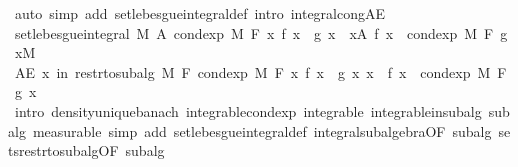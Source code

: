 \begin{isabellebody}
\ {\isacharparenleft}{\kern0pt}auto\ simp\ add{\isacharcolon}{\kern0pt}\ set{\isacharunderscore}{\kern0pt}lebesgue{\isacharunderscore}{\kern0pt}integral{\isacharunderscore}{\kern0pt}def\ intro{\isacharcolon}{\kern0pt}\ integral{\isacharunderscore}{\kern0pt}cong{\isacharunderscore}{\kern0pt}AE{\isacharparenright}{\kern0pt}\isanewline
\ \ \ \ \isamarkupfalse%
\ \isamarkupfalse%
\ {\isachardoublequoteopen}set{\isacharunderscore}{\kern0pt}lebesgue{\isacharunderscore}{\kern0pt}integral\ M\ A\ {\isacharparenleft}{\kern0pt}cond{\isacharunderscore}{\kern0pt}exp\ M\ F\ {\isacharparenleft}{\kern0pt}{\isasymlambda}x{\isachardot}{\kern0pt}\ f\ x\ {\isacharasterisk}{\kern0pt}\ g\ x{\isacharparenright}{\kern0pt}{\isacharparenright}{\kern0pt}\ {\isacharequal}{\kern0pt}\ {\isasymintegral}x{\isasymin}A{\isachardot}{\kern0pt}\ {\isacharparenleft}{\kern0pt}f\ x\ {\isacharasterisk}{\kern0pt}\ cond{\isacharunderscore}{\kern0pt}exp\ M\ F\ g\ x{\isacharparenright}{\kern0pt}{\isasympartial}M{\isachardoublequoteclose}\ \isacommand{{\isachardot}{\kern0pt}}\isamarkupfalse%
\isanewline
\ \ \isacommand{{\isacharbraceright}{\kern0pt}}\isamarkupfalse%
\isanewline
\ \ \isamarkupfalse%
\ {\isachardoublequoteopen}AE\ x\ in\ restr{\isacharunderscore}{\kern0pt}to{\isacharunderscore}{\kern0pt}subalg\ M\ F{\isachardot}{\kern0pt}\ cond{\isacharunderscore}{\kern0pt}exp\ M\ F\ {\isacharparenleft}{\kern0pt}{\isasymlambda}x{\isachardot}{\kern0pt}\ f\ x\ {\isacharasterisk}{\kern0pt}\ g\ x{\isacharparenright}{\kern0pt}\ x\ {\isacharequal}{\kern0pt}\ f\ x\ {\isacharasterisk}{\kern0pt}\ cond{\isacharunderscore}{\kern0pt}exp\ M\ F\ g\ x{\isachardoublequoteclose}\ \isamarkupfalse%
\ {\isacharparenleft}{\kern0pt}intro\ density{\isacharunderscore}{\kern0pt}unique{\isacharunderscore}{\kern0pt}banach\ integrable{\isacharunderscore}{\kern0pt}cond{\isacharunderscore}{\kern0pt}exp\ integrable\ integrable{\isacharunderscore}{\kern0pt}in{\isacharunderscore}{\kern0pt}subalg\ subalg{\isacharcomma}{\kern0pt}\ measurable{\isacharcomma}{\kern0pt}\ simp\ add{\isacharcolon}{\kern0pt}\ set{\isacharunderscore}{\kern0pt}lebesgue{\isacharunderscore}{\kern0pt}integral{\isacharunderscore}{\kern0pt}def\ integral{\isacharunderscore}{\kern0pt}subalgebra{}{\isacharbrackleft}{\kern0pt}OF\ subalg{\isacharbrackright}{\kern0pt}\ sets{\isacharunderscore}{\kern0pt}restr{\isacharunderscore}{\kern0pt}to{\isacharunderscore}{\kern0pt}subalg{\isacharbrackleft}{\kern0pt}OF\ subalg{\isacharbrackright}{\kern0pt}{\isacharparenright}{\kern0pt}\isanewline
\ \ \isamarkupfalse%

\end{isabellebody}
